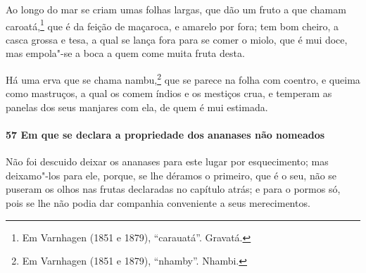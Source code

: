 \begin{linenumbers}
Ao longo do mar se criam umas folhas largas, que dão um fruto a que chamam
caroatá,\footnote{ Em Varnhagen (1851 e 1879), ``carauatá''. Gravatá.} que é da feição de
maçaroca, e amarelo por fora; tem bom cheiro, a casca grossa e tesa, a qual se lança fora
para se comer o miolo, que é mui doce, mas empola"-se a boca a quem come muita fruta desta.

Há uma erva que se chama nambu,\footnote{ Em Varnhagen (1851 e 1879), ``nhamby''. Nhambi.}
que se parece na folha com coentro, e queima como mastruços, a qual os comem índios e os
mestiços crua, e temperam as panelas dos seus manjares com ela, de quem é mui estimada.

\paragraph{57 Em que se declara a propriedade dos ananases não nomeados}\quad
Não foi descuido deixar os ananases para este lugar por esquecimento; mas deixamo"-los para
ele, porque, se lhe déramos o primeiro, que é o seu, não se puseram os olhos nas frutas
declaradas no capítulo atrás; e para o pormos só, pois se lhe não podia dar companhia
conveniente a seus merecimentos.


\end{linenumbers}
